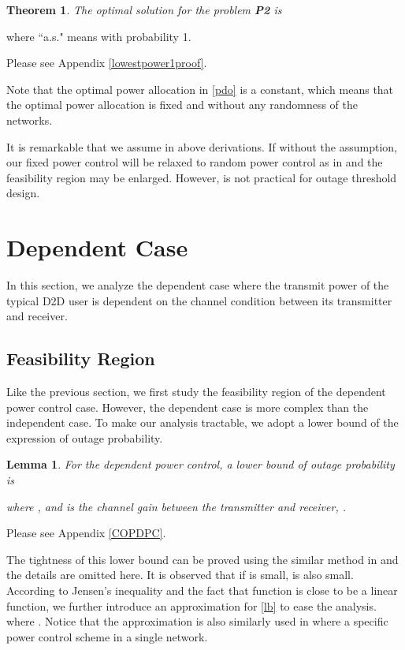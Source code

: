 \documentclass[12pt, draftclsnofoot, journal, letterpaper, onecolumn]{IEEEtran}
\newtheorem{lemma}{Lemma}[section]
\newtheorem{theorem}{Theorem}[section]
\begin{document}
\begin{theorem}\label{lowestpower1}
The optimal solution for the problem \textbf{P2} is

\end{theorem}
where ``a.s." means with probability 1.

\begin{IEEEproof}
  Please see Appendix \ref{lowestpower1proof}.
\end{IEEEproof}

Note that the optimal power allocation in \eqref{pdo} is a constant, which means that the optimal power allocation is fixed and without any randomness of the networks.

It is remarkable that we assume  in above derivations. If without the assumption, our fixed power control will be relaxed to random power control as in \cite{RPC} and the feasibility region may be enlarged. However,  is not practical for outage threshold design.



\section{Dependent Case}


In this section, we analyze the dependent case where the transmit power of the typical D2D
user is dependent on the channel condition between its transmitter and receiver.

\subsection{Feasibility Region}
Like the previous section, we first study the feasibility region of the dependent power control case. However, the dependent case is more complex than the independent case. To make our analysis tractable, we adopt a lower bound of the expression of outage probability.
\begin{lemma}\label{OPLB}
For the dependent power control, a lower bound of outage probability is

where ,  and  is the channel gain between the transmitter and receiver, .
\end{lemma}

\begin{IEEEproof}
  Please see Appendix \ref{COPDPC}.
\end{IEEEproof}

The tightness of this lower bound can be proved using the similar method in \cite{TC2} and the details are omitted here.
It is observed that if  is small,  is also small. According to Jensen's inequality and the fact that function  is close to be a linear function, we further introduce an approximation for \eqref{lb} to ease the analysis.  
where . Notice that the approximation is also similarly used in \cite{FPC} where a specific power control scheme in a single network.
\end{document}
